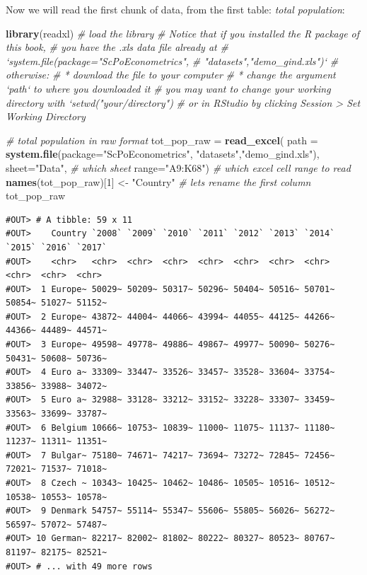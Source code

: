 \documentclass[]{book}
\newenvironment{Shaded}{\begin{snugshade}}{\end{snugshade}}
\newcommand{\KeywordTok}[1]{\textcolor[rgb]{0.13,0.29,0.53}{\textbf{#1}}}
\newcommand{\DataTypeTok}[1]{\textcolor[rgb]{0.13,0.29,0.53}{#1}}
\newcommand{\DecValTok}[1]{\textcolor[rgb]{0.00,0.00,0.81}{#1}}
\newcommand{\StringTok}[1]{\textcolor[rgb]{0.31,0.60,0.02}{#1}}
\newcommand{\CommentTok}[1]{\textcolor[rgb]{0.56,0.35,0.01}{\textit{#1}}}
\newcommand{\NormalTok}[1]{#1}
\begin{document}
Now we will read the first chunk of data, from the first table:
\emph{total population}:

\begin{Shaded}
\begin{Highlighting}[]
\KeywordTok{library}\NormalTok{(readxl)  }\CommentTok{# load the library}
\CommentTok{# Notice that if you installed the R package of this book,}
\CommentTok{# you have the .xls data file already at }
\CommentTok{# `system.file(package="ScPoEconometrics",}
\CommentTok{#                        "datasets","demo_gind.xls")`}
\CommentTok{# otherwise:}
\CommentTok{# * download the file to your computer}
\CommentTok{# * change the argument `path` to where you downloaded it}
\CommentTok{# you may want to change your working directory with `setwd("your/directory")}
\CommentTok{# or in RStudio by clicking Session > Set Working Directory}

\CommentTok{# total population in raw format}
\NormalTok{tot_pop_raw =}\StringTok{ }\KeywordTok{read_excel}\NormalTok{(}
                \DataTypeTok{path =} \KeywordTok{system.file}\NormalTok{(}\DataTypeTok{package=}\StringTok{"ScPoEconometrics"}\NormalTok{,}
                                    \StringTok{"datasets"}\NormalTok{,}\StringTok{"demo_gind.xls"}\NormalTok{), }
                \DataTypeTok{sheet=}\StringTok{"Data"}\NormalTok{, }\CommentTok{# which sheet}
                \DataTypeTok{range=}\StringTok{"A9:K68"}\NormalTok{)  }\CommentTok{# which excel cell range to read}
\KeywordTok{names}\NormalTok{(tot_pop_raw)[}\DecValTok{1}\NormalTok{] <-}\StringTok{ "Country"}   \CommentTok{# lets rename the first column}
\NormalTok{tot_pop_raw}
\end{Highlighting}
\end{Shaded}

\begin{verbatim}
#OUT> # A tibble: 59 x 11
#OUT>    Country `2008` `2009` `2010` `2011` `2012` `2013` `2014` `2015` `2016` `2017`
#OUT>    <chr>   <chr>  <chr>  <chr>  <chr>  <chr>  <chr>  <chr>  <chr>  <chr>  <chr> 
#OUT>  1 Europe~ 50029~ 50209~ 50317~ 50296~ 50404~ 50516~ 50701~ 50854~ 51027~ 51152~
#OUT>  2 Europe~ 43872~ 44004~ 44066~ 43994~ 44055~ 44125~ 44266~ 44366~ 44489~ 44571~
#OUT>  3 Europe~ 49598~ 49778~ 49886~ 49867~ 49977~ 50090~ 50276~ 50431~ 50608~ 50736~
#OUT>  4 Euro a~ 33309~ 33447~ 33526~ 33457~ 33528~ 33604~ 33754~ 33856~ 33988~ 34072~
#OUT>  5 Euro a~ 32988~ 33128~ 33212~ 33152~ 33228~ 33307~ 33459~ 33563~ 33699~ 33787~
#OUT>  6 Belgium 10666~ 10753~ 10839~ 11000~ 11075~ 11137~ 11180~ 11237~ 11311~ 11351~
#OUT>  7 Bulgar~ 75180~ 74671~ 74217~ 73694~ 73272~ 72845~ 72456~ 72021~ 71537~ 71018~
#OUT>  8 Czech ~ 10343~ 10425~ 10462~ 10486~ 10505~ 10516~ 10512~ 10538~ 10553~ 10578~
#OUT>  9 Denmark 54757~ 55114~ 55347~ 55606~ 55805~ 56026~ 56272~ 56597~ 57072~ 57487~
#OUT> 10 German~ 82217~ 82002~ 81802~ 80222~ 80327~ 80523~ 80767~ 81197~ 82175~ 82521~
#OUT> # ... with 49 more rows
\end{verbatim}
\end{document}
